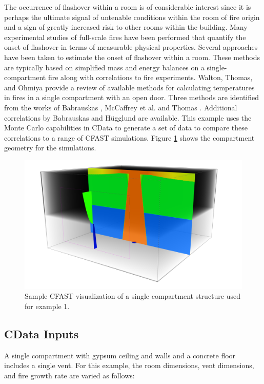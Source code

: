 \documentclass[12pt,twoside]{book}
\begin{document}
The occurrence of flashover within a room is of considerable interest since it is perhaps the ultimate signal of untenable conditions within the room of fire origin and a sign of greatly increased risk to other rooms within the building. Many experimental studies of full-scale fires have been performed that quantify the onset of flashover in terms of measurable physical properties. Several approaches have been taken to estimate the onset of flashover within a room. These methods are typically based on simplified mass and energy balances on a single-compartment fire along with correlations to fire experiments. Walton, Thomas, and Ohmiya \cite{Walton:2016} provide a review of available methods for calculating temperatures in fires in a single compartment with an open door. Three methods are identified from the works of Babrauskas \cite{Babrauskas:1980}, McCaffrey et al. \cite{McCaffrey:1981uq} and Thomas \cite{Thomas:1981fk}. Additional correlations by Babrauskas \cite{Babrauskas:1980} and H\"ugglund \cite{Hagglund:1980} are available. This example uses the Monte Carlo capabilities in CData to generate a set of data to compare these correlations to a range of CFAST simulations. Figure \ref{flashover_geometry} shows the compartment geometry for the simulations.

\begin{figure}[h!]
\centering
\includegraphics[width=4.5in]{FIGURES/Flashover.png}
\caption{Sample CFAST visualization of a single compartment structure used for example 1.}
\label{flashover_geometry}
\end{figure}

\subsection{CData Inputs}
A single compartment with gypsum ceiling and walls and a concrete floor includes a single vent. For this example, the room dimensions, vent dimensions, and fire growth rate are varied as follows:
\end{document}

